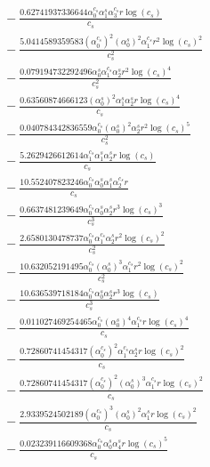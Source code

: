 \documentclass[10pt]{article}
\begin{document}
\begin{align*}
&{}  - \frac{0.62741937336644 \alpha_{0}^{c_s} \alpha_{1}^s \alpha_{3}^{c_s} r \log{\left(c_{s} \right)}}{c_{s}} \\
&{}  - \frac{5.0414589359583 \left(\alpha_{0}^{c_s}\right)^{2} \left(\alpha_{0}^s\right)^{2} \alpha_{1}^{c_s} r^{2} \log{\left(c_{s} \right)}^{2}}{c_{s}^{2}} \\
&{}  - \frac{0.079194732292496 \alpha_{0}^s \alpha_{1}^{c_s} \alpha_{2}^s r^{2} \log{\left(c_{s} \right)}^{4}}{c_{s}^{2}} \\
&{}  - \frac{0.63560874666123 \left(\alpha_{0}^s\right)^{2} \alpha_{1}^s \alpha_{2}^s r \log{\left(c_{s} \right)}^{4}}{c_{s}} \\
&{}  - \frac{0.040784342836559 \alpha_{0}^{c_s} \left(\alpha_{0}^s\right)^{2} \alpha_{2}^s r^{2} \log{\left(c_{s} \right)}^{5}}{c_{s}^{2}} \\
&{}  - \frac{5.2629426612614 \alpha_{1}^{c_s} \alpha_{1}^s \alpha_{2}^s r \log{\left(c_{s} \right)}}{c_{s}} \\
&{}  - \frac{10.552407823246 \alpha_{0}^{c_s} \alpha_{0}^s \alpha_{1}^s \alpha_{2}^{c_s} r}{c_{s}} \\
&{}  - \frac{0.6637481239649 \alpha_{0}^{c_s} \alpha_{0}^s \alpha_{2}^s r^{3} \log{\left(c_{s} \right)}^{3}}{c_{s}^{3}} \\
&{}  - \frac{2.6580130478737 \alpha_{0}^{c_s} \alpha_{1}^{c_s} \alpha_{2}^s r^{2} \log{\left(c_{s} \right)}^{2}}{c_{s}^{2}} \\
&{}  - \frac{10.632052191495 \alpha_{0}^{c_s} \left(\alpha_{0}^s\right)^{3} \alpha_{1}^{c_s} r^{2} \log{\left(c_{s} \right)}^{2}}{c_{s}^{2}} \\
&{}  - \frac{10.636539718184 \alpha_{0}^{c_s} \alpha_{0}^s \alpha_{2}^s r^{3} \log{\left(c_{s} \right)}}{c_{s}^{3}} \\
&{}  - \frac{0.011027469254465 \alpha_{0}^{c_s} \left(\alpha_{0}^s\right)^{4} \alpha_{1}^{c_s} r \log{\left(c_{s} \right)}^{4}}{c_{s}} \\
&{}  - \frac{0.72860741454317 \left(\alpha_{0}^{c_s}\right)^{2} \alpha_{1}^{c_s} \alpha_{2}^s r \log{\left(c_{s} \right)}^{2}}{c_{s}} \\
&{}  - \frac{0.72860741454317 \left(\alpha_{0}^{c_s}\right)^{2} \left(\alpha_{0}^s\right)^{3} \alpha_{1}^{c_s} r \log{\left(c_{s} \right)}^{2}}{c_{s}} \\
&{}  - \frac{2.9339524502189 \left(\alpha_{0}^{c_s}\right)^{3} \left(\alpha_{0}^s\right)^{2} \alpha_{1}^s r \log{\left(c_{s} \right)}^{2}}{c_{s}} \\
&{}  - \frac{0.023239116609368 \alpha_{0}^{c_s} \alpha_{0}^s \alpha_{4}^s r \log{\left(c_{s} \right)}^{5}}{c_{s}} \\

\end{align*}
\end{document}
